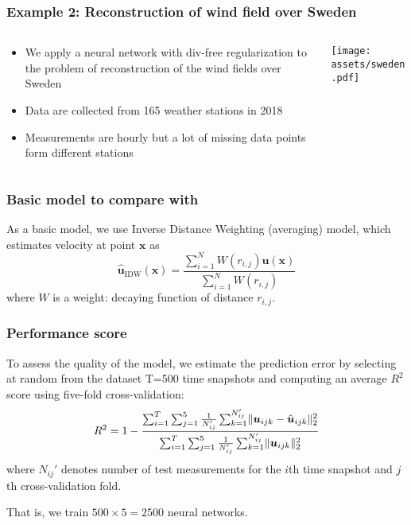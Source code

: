 \documentclass{beamer}
\renewcommand{\vec}[1]{\boldsymbol{#1}}
\DeclarePairedDelimiter\norm{\lVert}{\rVert}
\begin{document}
\begin{frame}
\frametitle{Example 2: Reconstruction of wind field over Sweden}

\begin{columns}
\begin{column}{0.7\linewidth}
\begin{itemize}
    \item We apply a neural network with div-free regularization
        to the problem of reconstruction of the wind fields over Sweden    
    \item Data are collected from 165 weather stations in 2018
    \item Measurements are hourly but a lot of missing data points form
        different stations
\end{itemize}
\end{column}
\begin{column}{0.3\linewidth}
    \texttt{[image: assets/sweden.pdf]}
\end{column}
\end{columns}

\end{frame}

\begin{frame}
\frametitle{Basic model to compare with}

As a basic model, we use Inverse Distance Weighting (averaging) model, which
estimates velocity at point $\vec x$ as
\[
    \hat{\vec u}_{\text{IDW}}(\vec x) =
        \frac{\sum_{i=1}^N W(r_{i,j}) \vec u(\vec x)}{\sum_{i=1}^N W(r_{i,j})}
\]
where $W$ is a weight: decaying function of distance $r_{i, j}$.

\end{frame}


\begin{frame}
\frametitle{Performance score}

To assess the quality of the model, we estimate the prediction error
by selecting at random from the dataset T=500 time snapshots and computing
an average $R^2$ score using five-fold cross-validation:
\[
    R^2 = 1 - \frac{%
        \sum_{i=1}^T \sum_{j=1}^5 \frac{1}{N_{ij}'}
            \sum_{k=1}^{N_{ij}'} \norm{\vec{u}_{ijk} - \hat{\vec{u}}_{ijk}}^2_2}
    {%
        \sum_{i=1}^T \sum_{j=1}^5 \frac{1}{N_{ij}'}
            \sum_{k=1}^{N_{ij}'} \norm{\vec{u}_{ijk}}^2_2}
\]
where $N_{ij}'$ denotes number of test measurements for the $i$th time snapshot
and $j$th cross-validation fold.

That is, we train $500\times5=2500$ neural networks.

\end{frame}
\end{document}
